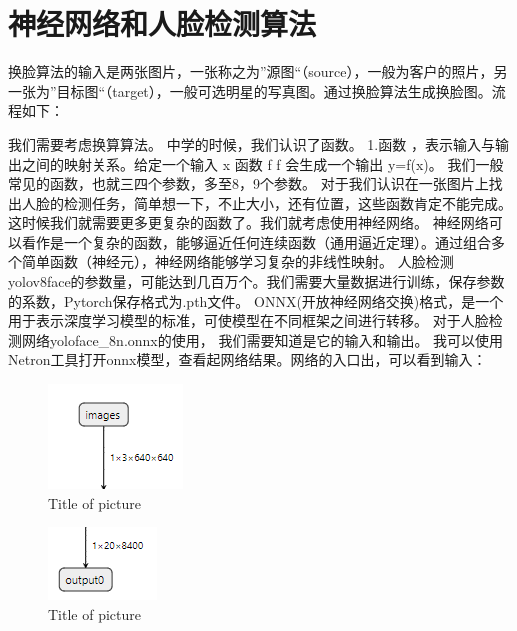 \chapter{神经网络和人脸检测算法}
换脸算法的输入是两张图片，一张称之为”源图“（source），一般为客户的照片，另一张为”目标图“（target），一般可选明星的写真图。通过换脸算法生成换脸图。流程如下：

我们需要考虑换算算法。
中学的时候，我们认识了函数。
1.函数 ，表示输入与输出之间的映射关系。给定一个输入 x 函数  f
f 会生成一个输出 y=f(x)。 我们一般常见的函数，也就三四个参数，多至8，9个参数。
对于我们认识在一张图片上找出人脸的检测任务，简单想一下，不止大小，还有位置，这些函数肯定不能完成。这时候我们就需要更多更复杂的函数了。我们就考虑使用神经网络。
神经网络可以看作是一个复杂的函数，能够逼近任何连续函数（通用逼近定理）。通过组合多个简单函数（神经元），神经网络能够学习复杂的非线性映射。
人脸检测yolov8face的参数量，可能达到几百万个。我们需要大量数据进行训练，保存参数的系数，Pytorch保存格式为.pth文件。
ONNX(开放神经网络交换)格式，是一个用于表示深度学习模型的标准，可使模型在不同框架之间进行转移。
对于人脸检测网络yoloface_8n.onnx的使用， 我们需要知道是它的输入和输出。
我可以使用Netron工具打开onnx模型，查看起网络结果。网络的入口出，可以看到输入：


\begin{figure}[H]
\centering
\includegraphics{figures/inputs.png}
\caption{Title of picture}
\end{figure}

\begin{figure}[H]
\centering
\includegraphics{figures/output.png}
\caption{Title of picture}
\end{figure}





